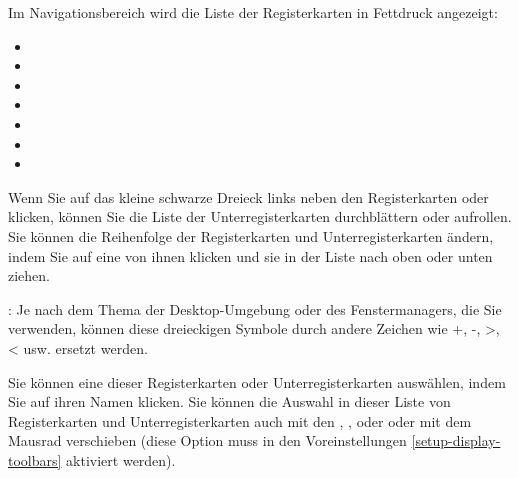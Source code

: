 Im Navigationsbereich wird die Liste der Registerkarten in Fettdruck angezeigt:
	\begin{itemize}
		\item {}%
		\item {}%
		\item {}%
		\item {}%
		\item {}%
		\item {}%
		\item {}%
	\end{itemize}
Wenn Sie auf das kleine schwarze Dreieck links neben den Registerkarten  oder  klicken, können Sie die Liste der Unterregisterkarten durchblättern oder aufrollen. Sie können die Reihenfolge der Registerkarten und Unterregisterkarten ändern, indem Sie auf eine von ihnen klicken und sie in der Liste nach oben oder unten ziehen.%


\Note{}:  Je nach dem Thema der Desktop-Umgebung oder des Fenstermanagers, die Sie verwenden, können diese dreieckigen Symbole durch andere Zeichen wie +, -, >, < usw. ersetzt werden.%


Sie können eine dieser Registerkarten oder Unterregisterkarten auswählen, indem Sie auf ihren Namen klicken. Sie können die Auswahl in dieser Liste von Registerkarten und Unterregisterkarten auch mit den \keys{\arrowkeyup}, \keys{\arrowkeydown},  oder  oder mit dem Mausrad verschieben (diese Option muss in den Voreinstellungen \vref{setup-display-toolbars} aktiviert werden).%

